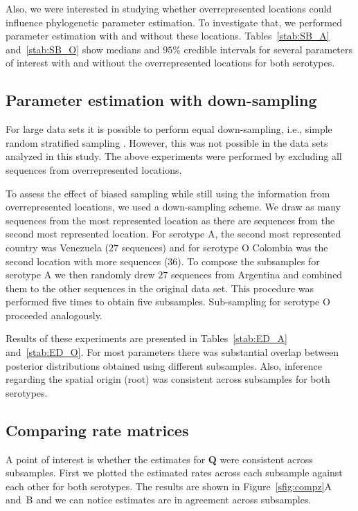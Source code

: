 \documentclass[a4paper,10pt]{article}
\begin{document}
Also, we were interested in studying whether overrepresented locations could influence phylogenetic parameter estimation.
To investigate that, we performed parameter estimation with and without these locations.
Tables~\ref{stab:SB_A} and~\ref{stab:SB_O} show medians and $95 \%$ credible intervals for several parameters of interest with and without the overrepresented locations
for both serotypes.
\subsection{Parameter estimation with down-sampling}

For large data sets it is possible to perform equal down-sampling, i.e., simple random stratified sampling \cite{M-fluPNAS}.
However, this was not possible in the data sets analyzed in this study.
The above experiments were performed by excluding all sequences from overrepresented locations.

To assess the effect of biased sampling while still using the information from overrepresented locations, we used a down-sampling scheme.
We draw as many sequences from the most represented location as there are sequences from the second most represented location.
For serotype A, the second most represented country was Venezuela ($27$ sequences) and for serotype O Colombia was the second location with more sequences ($36$).
To compose the subsamples for serotype A we then randomly drew $27$ sequences from Argentina and combined them to the other sequences in the original data set.
This procedure was performed five times to obtain five subsamples.
Sub-sampling for serotype O proceeded analogously.

Results of these experiments are presented in Tables~\ref{stab:ED_A} and~\ref{stab:ED_O}.
For most parameters there was substantial overlap between posterior distributions obtained using different subsamples.
Also, inference regarding the spatial origin (root) was consistent across subsamples for both serotypes.

\subsection{Comparing rate matrices}

A point of interest is whether the estimates for $\mathbf{Q}$ were consistent across subsamples.
First we plotted the estimated rates across each subsample against each other for both serotypes.
The results are shown in Figure~\ref{sfig:compz}A and~B and we can notice estimates are in agreement across subsamples.
\end{document}
